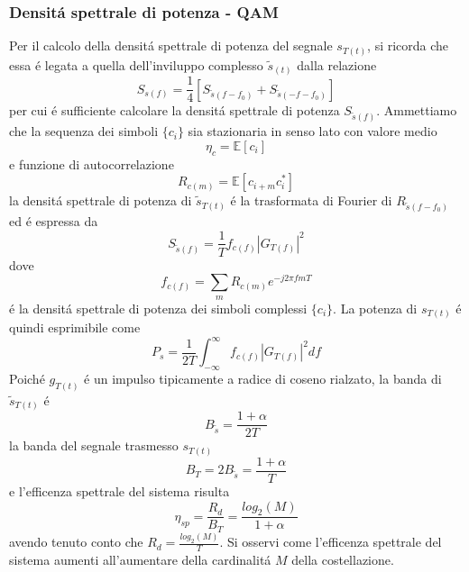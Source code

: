         \subsubsection{Densitá spettrale di potenza - QAM}
            Per il calcolo della densitá spettrale di potenza del segnale $s_{T(t)}$, si ricorda che essa é legata a quella dell'inviluppo
            complesso $\tilde{s}_{(t)}$ dalla relazione
            \[
                S_{s(f)} = \frac{1}{4}\left[S_{\tilde{s}{(f-f_0)}}+ S_{\tilde{s}{(-f-f_0)}}\right]    
            \]
            per cui é sufficiente calcolare la densitá spettrale di potenza $S_{\tilde{s}(f)}$. Ammettiamo che la sequenza dei 
            simboli $\{c_i\}$ sia stazionaria in senso lato con valore medio 
            \[
                \eta_c=\mathbb{E}[c_i]    
            \] 
            e funzione di autocorrelazione
            \[
                R_{c(m)} = \mathbb{E}[c_{i+m}c^\ast_i]    
            \]
            la densitá spettrale di potenza di $\tilde{s}_{T(t)}$ é la trasformata di Fourier di $R_{\tilde{s}{(f-f_0)}}$ ed é espressa da
            \[
                S_{\tilde{s}{(f)}} = \frac{1}{T} f_{c(f)}\left|G_{T(f)}\right|^2    
            \]
            dove 
            \[
                f_{c(f)} = \sum_{m}R_{c(m)}e^{-j2\pi fmT}
            \]
            é la densitá spettrale di potenza dei simboli complessi $\{c_i\}$. La potenza di $s_{T(t)}$ é quindi esprimibile come
            \[
                P_s=\frac{1}{2T} \int_{-\infty}^{\infty} f_{c(f)} \left|G_{T(f)}\right|^2 df
            \]
            Poiché $g_{T(t)}$ é un impulso tipicamente a radice di coseno rialzato, la banda di $\tilde{s}_{T(t)}$ é 
            \[
                B_{\tilde{s}}=\frac{1+\alpha}{2T}    
            \]
            la banda del segnale trasmesso $s_{T(t)}$ 
            \[
                B_{T}=2B_{\tilde{s}} =\frac{1+\alpha}{T}
            \]
            e l'efficenza spettrale del sistema risulta 
            \[
                \eta_{sp} = \frac{R_d}{B_T} = \frac{log_2(M)}{1+\alpha} 
            \]
            avendo tenuto conto che $R_d = \frac{log_2(M)}{T}$. Si osservi come l'efficenza spettrale del sistema aumenti all'aumentare 
            della cardinalitá $M$ della costellazione.
